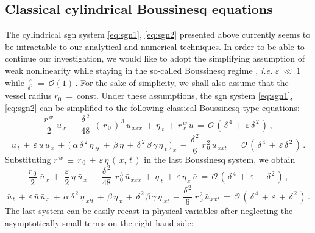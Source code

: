 \documentclass[alpha-refs, 12pt]{wiley-article}
\renewcommand{\O}{\mathcal{O}}
\newcommand{\eps}{\varepsilon}
\begin{document}
\subsection{Classical cylindrical Boussinesq equations}

The cylindrical \acrshort{sgn} system \eqref{eq:sgn1}, \eqref{eq:sgn2} presented above currently seems to be intractable to our analytical and numerical techniques. In order to be able to continue our investigation, we would like to adopt the simplifying assumption of weak nonlinearity while staying in the so-called Boussinesq regime \cite{DMII, Dutykh2014f, Dutykh2007, DMS1}, \emph{i.e.} $\eps\ \ll\ 1$ while $\frac{\eps}{\delta^2}\ =\ \O(1)\,$. For the sake of simplicity, we shall also assume that the vessel radius $r_0\ =\ \mathrm{const}$. Under these assumptions, the \acrshort{sgn} system \eqref{eq:sgn1}, \eqref{eq:sgn2} can be simplified to the following classical Boussinesq-type equations:
\begin{equation}\label{eq:5.1}
  \frac{r^{\,w}}{2}\;\bar{u}_{\,x}\,-\;\frac{\delta^{\,2}}{48}\;\,(\,r_{\,0}\,)^{\,3}\,\bar{u}_{\,xxx}\,+\,\eta_{\;t}\,+\,r^{\,w}_{\,x}\,\bar{u}\,=\,\O\,(\,\delta^{\,4}\,+\,\eps\,\delta^{\,2}\,)\,,
\end{equation}
\begin{equation}\label{eq:5.2}
  \bar{u}_{\,t}\, + \,\eps\,\bar{u}\,\bar{u}_{\,x}\, + \,\bigl(\,\alpha\,\delta^{\,2}\,\eta_{\;tt}\, + \,\beta\,\eta\, + \,\delta^{\,2}\,\beta\,\gamma\,\eta_{\;t}\,\bigr)_{\,x}\, - \,\frac{\delta^{\,2}}{6}\;r_{\,0}^{\,2}\,\bar{u}_{\,xxt}\, =\, \O\,(\,\delta^{\,4}\,+\,\eps\,\delta^{\,2}\,)\,.
\end{equation}
Substituting $r^{\,w}\,\equiv\, r_{\,0}\,+\,\eps\,\eta\,(\,x,\,t\,)$ in the last Boussinesq system, we obtain
\begin{equation*}
  \frac{r_{\,0}}{2}\;\bar{u}_{\,x}\, + \,\,\frac{\eps}{2}\,\eta\;\bar{u}_{\,x}\, -\;\frac{\delta^{\,2}}{48}\;\,r_{\,0}^{\,3}\,\bar{u}_{\,xxx}\, + \,\eta_{\;t}\, + \,\eps\,\eta_{\,x}\,\bar{u}\, = \,\O\,(\,\delta^{\,4}\,+\,\eps\,+\,\delta^{\,2}\,)\,,
\end{equation*}
\begin{equation*}
  \bar{u}_{\,t}\, + \,\eps\,\bar{u}\,\bar{u}_{\,x}\, + \,\alpha\,\delta^{\,2}\,\eta_{\;xtt}\, + \,\beta\,\eta_{\,x}\, + \,\delta^{\,2}\,\beta\,\gamma\,\eta_{\;xt}\, - \,\frac{\delta^{\,2}}{6}\;r_{\,0}^{\,2}\,\bar{u}_{\,xxt}\, = \,\O\,(\,\delta^{\,4}\,+\,\eps\,+\,\delta^{\,2}\,)\,.
\end{equation*}
The last system can be easily recast in physical variables after neglecting the asymptotically small terms on the right-hand side:
\end{document}
